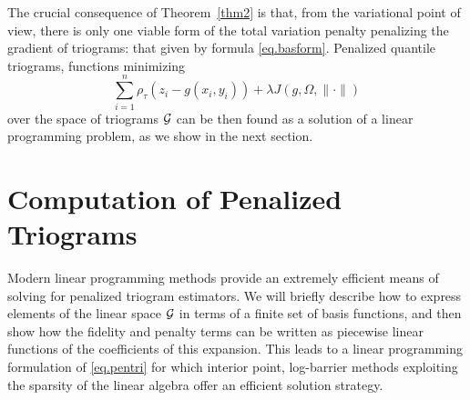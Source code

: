 The crucial consequence of Theorem~\ref{thm2} is that, from the
variational point of view, there is only one viable form of the total
variation penalty penalizing the gradient of triograms: that given by
formula \eqref{eq.basform}. Penalized quantile triograms, functions minimizing
\begin{equation}
\label{eq.pentri}
\sum_{i=1}^n \rho_\tau (z_i - g(x_i , y_i )) 
+ \lambda J(g, \varOmega,\| \cdot \|)
\end{equation}
over the space of triograms $\mathcal{G}$ can be then found as a solution of a
linear programming problem, as we show in the next section.


\section{Computation of Penalized Triograms}

Modern linear programming methods provide an extremely efficient means of
solving for penalized triogram estimators.  We will briefly describe how to
express elements of the linear space $\mathcal{G}$ in terms of a finite set of
basis functions, and then show how the fidelity and penalty terms can be
written as piecewise linear functions of the coefficients of this expansion.
This leads to a linear programming formulation of \eqref{eq.pentri}
for which interior point, log-barrier methods exploiting the sparsity
of the linear algebra offer an efficient solution strategy.

